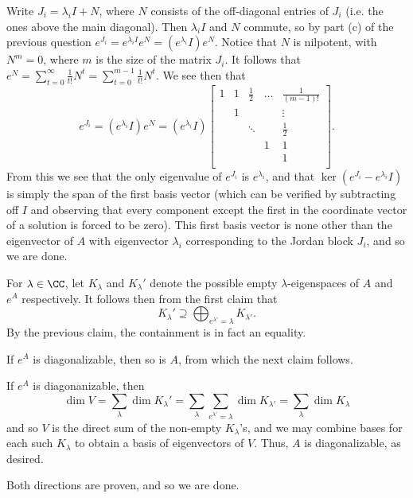 \documentclass{scrartcl}
\begin{document}
\begin{solution}
\begin{subproof}
        Write $J_i=\lambda_iI+N$, where $N$ consists of the off-diagonal entries of $J_i$ (i.e. the ones above the main diagonal). Then $\lambda_i I$ and $N$ commute, so by part (c) of the previous question $e^{J_i}=e^{\lambda_iI}e^N=(e^{\lambda_i}I)e^N$. Notice that $N$ is nilpotent, with $N^m=0$, where $m$ is the size of the matrix $J_i$. It follows that $e^N=\sum_{t=0}^\infty \tfrac{1}{t!}N^t=\sum_{t=0}^{m-1} \tfrac{1}{t!}N^t$. We see then that
        \[e^{J_i}=(e^{\lambda_i}I)e^N=(e^{\lambda_i}I)
        \begin{bmatrix}
        1 & 1 & \tfrac{1}{2} & \hdots & \tfrac{1}{(m-1)!} \\
        & 1 & & & \vdots \\
        & & \ddots & & \tfrac{1}{2} \\
        & & & 1 & 1 \\
        & & & & 1\\
        \end{bmatrix}.\]
        From this we see that the only eigenvalue of $e^{J_i}$ is $e^{\lambda_i}$, and that $\ker(e^{J_i}-e^{\lambda_i}I)$ is simply the span of the first basis vector (which can be verified by subtracting off $I$ and observing that every component except the first in the coordinate vector of a solution is forced to be zero). This first basis vector is none other than the eigenvector of $A$ with eigenvector $\lambda_i$ corresponding to the Jordan block $J_i$, and so we are done.
        \end{subproof}
        
        For $\lambda\in \CC$, let $K_\lambda$ and $K_\lambda'$ denote the possible empty $\lambda$-eigenspaces of $A$ and $e^A$ respectively. It follows then from the first claim that 
        \[K_\lambda'\supseteq\bigoplus_{e^{\lambda'}=\lambda} K_{\lambda'}.\]
        By the previous claim, the containment is in fact an equality.
        \begin{claimbox}
        If $e^A$ is diagonalizable, then so is $A$, from which the next claim follows.
        \end{claimbox}
        \begin{subproof}
        If $e^A$ is diagonanizable, then \[\dim V=\sum_\lambda \dim K_\lambda'=\sum_\lambda \sum_{e^{\lambda'}=\lambda}\dim K_{\lambda'}=\sum_{\lambda}\dim K_\lambda\] and so $V$ is the direct sum of the non-empty $K_\lambda$'s, and we may combine bases for each such $K_\lambda$ to obtain a basis of eigenvectors of $V$. Thus, $A$ is diagonalizable, as desired.
        \end{subproof}
        
        Both directions are proven, and so we are done.
        \end{solution}
\end{document}
